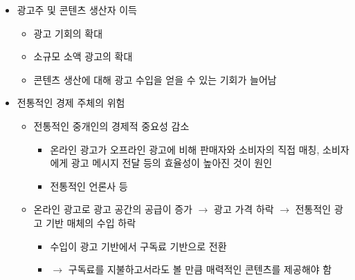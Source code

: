\begin{itemize}
\begin{itemize}
	\end{itemize}
\item 광고주 및 콘텐츠 생산자 이득 \citep{Evans:2009aa}
	\begin{itemize}
	\item 광고 기회의 확대
	\item 소규모 소액 광고의 확대
	\item 콘텐츠 생산에 대해 광고 수입을 얻을 수 있는 기회가 늘어남
	\end{itemize}
\item 전통적인 경제 주체의 위험
	\begin{itemize}
	\item 전통적인 중개인의 경제적 중요성 감소
		\begin{itemize}
		\item 온라인 광고가 오프라인 광고에 비해 판매자와 소비자의 직접 매칭, 소비자에게 광고 메시지 전달 등의 효율성이 높아진 것이 원인
		\item 전통적인 언론사 등
		\end{itemize}
	\item 온라인 광고로 광고 공간의 공급이 증가 $\rightarrow$ 광고 가격 하락 $\rightarrow$ 전통적인 광고 기반 매체의 수입 하락	
		\begin{itemize}
		\item 수입이 광고 기반에서 구독료 기반으로 전환
		\item $\rightarrow$ 구독료를 지불하고서라도 볼 만큼 매력적인 콘텐츠를 제공해야 함
		\end{itemize}
	\end{itemize}
\end{itemize}

\pagebreak

